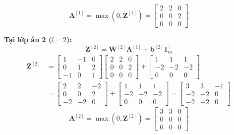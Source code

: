 \begin{equation}
\mathbf{A}^{[1]} = \max(0, \mathbf{Z}^{[1]}) = 
\begin{bmatrix}
    2 & 2 & 0 \\
    0 & 0 & 2 \\
    0 & 0 & 0
\end{bmatrix}
\end{equation}

\textbf{Tại lớp ẩn 2 ($l=2$):}
\[
\mathbf{Z}^{[2]} = \mathbf{W}^{[2]}\mathbf{A}^{[1]} + \mathbf{b}^{[2]}\mathbf{1}_m^{\top}
\]
\begin{align*}
\mathbf{Z}^{[2]} 
&= 
\begin{bmatrix}
    1 & -1 & 0 \\
    0 & 1 & 2 \\
    -1 & 0 & 1
\end{bmatrix}
\begin{bmatrix}
    2 & 2 & 0 \\
    0 & 0 & 2 \\
    0 & 0 & 0
\end{bmatrix}
+
\begin{bmatrix}
    1 & 1 & 1 \\
    -2 & -2 & -2 \\
    0 & 0 & 0
\end{bmatrix} \\
&= 
\begin{bmatrix}
    2 & 2 & -2 \\
    0 & 0 & 2 \\
    -2 & -2 & 0
\end{bmatrix}
+
\begin{bmatrix}
    1 & 1 & 1 \\
    -2 & -2 & -2 \\
    0 & 0 & 0
\end{bmatrix}
=
\begin{bmatrix}
    3 & 3 & -1 \\
    -2 & -2 & 0 \\
    -2 & -2 & 0
\end{bmatrix}
\end{align*}
\[\mathbf{A}^{[2]} = \max(0, \mathbf{Z}^{[2]}) = 
\begin{bmatrix}
    3 & 3 & 0 \\
    0 & 0 & 0 \\
    0 & 0 & 0
\end{bmatrix}\]
